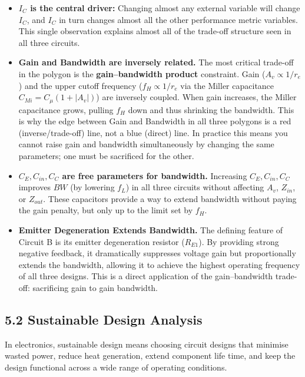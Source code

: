 \documentclass[11pt, a4paper]{article}
\begin{document}
\begin{itemize}
    \item \textbf{$I_C$ is the central driver:} Changing almost any external variable will change $I_C$, and $I_C$ in turn changes almost all the other performance metric variables. This single observation explains almost all of the trade-off structure seen in all three circuits.

    \item \textbf{Gain and Bandwidth are inversely related.} The most critical trade-off in the polygon is the \textbf{gain--bandwidth product} constraint. Gain ($A_v \propto 1/r_e$) and the upper cutoff frequency ($f_H \propto 1/r_e$ via the Miller capacitance $C_{Mi} = C_\mu(1+|A_v|)$) are inversely coupled. When gain increases, the Miller capacitance grows, pulling $f_H$ down and thus shrinking the bandwidth. This is why the edge between Gain and Bandwidth in all three polygons is a red (inverse/trade-off) line, not a blue (direct) line. In practice this means you cannot raise gain and bandwidth simultaneously by changing the same parameters; one must be sacrificed for the other.

    \item \textbf{$C_E, C_{in}, C_C$ are free parameters for bandwidth.} Increasing $C_E, C_{in}, C_C$ improves $BW$ (by lowering $f_L$) in all three circuits without affecting $A_v$, $Z_{in}$, or $Z_{out}$. These capacitors provide a way to extend bandwidth without paying the gain penalty, but only up to the limit set by $f_H$.

    \item \textbf{Emitter Degeneration Extends Bandwidth.} The defining feature of Circuit B is its emitter degeneration resistor ($R_{E1}$). By providing strong negative feedback, it dramatically suppresses voltage gain but proportionally extends the bandwidth, allowing it to achieve the highest operating frequency of all three designs. This is a direct application of the gain--bandwidth trade-off: sacrificing gain to gain bandwidth.
\end{itemize}

\subsection*{5.2 Sustainable Design Analysis}

In electronics, sustainable design means choosing circuit designs that minimise wasted power, reduce heat generation, extend component life time, and keep the design functional across a wide range of operating conditions.
\end{document}
